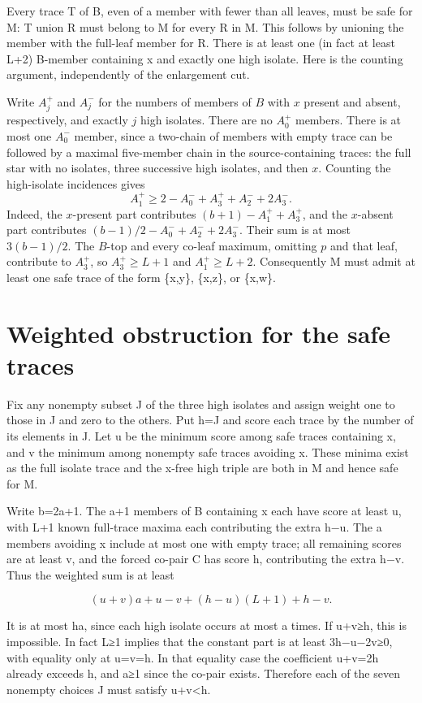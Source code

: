 \documentclass[11pt,letterpaper]{article}
\begin{document}
Every trace T of B, even of a member with fewer than all leaves, must be
safe for M: T union R must belong to M for every R in M. This follows by
unioning the member with the full-leaf member for R. There is at least
one (in fact at least L+2) B-member containing x and exactly one high
isolate. Here is the counting argument, independently of the enlargement
cut.

Write \(A_j^+\) and \(A_j^-\) for the numbers of members of \(B\) with
\(x\) present and absent, respectively, and exactly \(j\) high isolates.
There are no \(A_0^+\) members. There is at most one \(A_0^-\) member,
since a two-chain of members with empty trace can be followed by a
maximal five-member chain in the source-containing traces: the full star
with no isolates, three successive high isolates, and then \(x\).
Counting the high-isolate incidences gives
\[
 A_1^+ \ge 2-A_0^-+A_3^++A_2^-+2A_3^-.
\]
Indeed, the \(x\)-present part contributes \((b+1)-A_1^++A_3^+\),
and the \(x\)-absent part contributes
\((b-1)/2-A_0^-+A_2^-+2A_3^-\). Their sum is at most \(3(b-1)/2\).
The \(B\)-top and every co-leaf maximum, omitting \(p\) and that leaf,
contribute to \(A_3^+\), so \(A_3^+\ge L+1\) and \(A_1^+\ge L+2\).
Consequently M must admit at least one safe trace of the
form \{x,y\}, \{x,z\}, or \{x,w\}.

\section{Weighted obstruction for the safe
traces}\label{weighted-obstruction-for-the-safe-traces}

Fix any nonempty subset J of the three high isolates and assign weight
one to those in J and zero to the others. Put h=\textbar J\textbar{} and
score each trace by the number of its elements in J. Let u be the
minimum score among safe traces containing x, and v the minimum among
nonempty safe traces avoiding x. These minima exist as the full isolate
trace and the x-free high triple are both in M and hence safe for M.

Write b=2a+1. The a+1 members of B containing x each have score at least
u, with L+1 known full-trace maxima each contributing the extra h−u. The
a members avoiding x include at most one with empty trace; all remaining
scores are at least v, and the forced co-pair C has score h,
contributing the extra h−v. Thus the weighted sum is at least

\[
 (u+v)a+u-v+(h-u)(L+1)+h-v.
\]

It is at most ha, since each high isolate occurs at most a times. If
u+v≥h, this is impossible. In fact L≥1 implies that the constant part is
at least 3h−u−2v≥0, with equality only at u=v=h. In that equality case
the coefficient u+v=2h already exceeds h, and a≥1 since the co-pair
exists. Therefore each of the seven nonempty choices J must satisfy
u+v\textless h.
\end{document}
